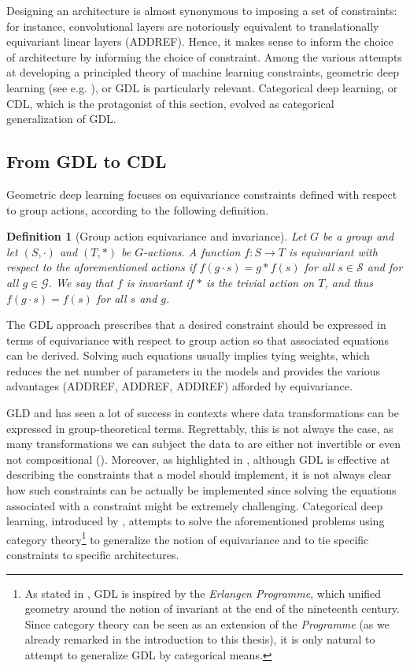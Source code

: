 \documentclass[12pt,a4paper,openright,twoside]{report}
\theoremstyle{plain}
\newtheorem{definition}[proposition]{Definition}
\theoremstyle{definition}
\begin{document}
Designing an architecture is almost synonymous to imposing a set of constraints: for instance, convolutional layers are notoriously equivalent to translationally equivariant linear layers (ADDREF).
Hence, it makes sense to inform the choice of architecture by informing the choice of constraint. Among the various attempts at developing a principled theory of machine learning constraints, geometric deep learning (see e.g. \cite{bronstein2021geometric}), or GDL is particularly relevant. Categorical deep learning, or CDL, which is the protagonist of this section, evolved as categorical generalization of GDL.


\subsection{From GDL to CDL}

Geometric deep learning focuses on equivariance constraints defined with respect to group actions, according to the following definition.

\begin{definition}[Group action equivariance and invariance]
  Let $G$ be a group and let $(S, \cdot)$ and $(T, \ast)$ be $G$-actions. A function $f: S \to T$ is equivariant with respect to the aforementioned actions if $f(g \cdot s) = g \ast f(s)$ for all $s \in \mathcal{S}$ and for all $g \in \mathcal{G}$. We say that $f$ is invariant if $\ast$ is the trivial action on $T$, and thus $f(g \cdot s) = f(s)$ for all $s$ and $g$.
\end{definition}

The GDL approach prescribes that a desired constraint should be expressed in terms of equivariance with respect to group action so that associated equations can be derived. Solving such equations usually implies tying weights, which reduces the net number of parameters in the models and provides the various advantages (ADDREF, ADDREF, ADDREF) afforded by equivariance.


GLD and has seen a lot of success in contexts where data transformations can be expressed in group-theoretical terms. Regrettably, this is not always the case, as many transformations we can subject the data to are either not invertible or even not compositional (\cite{gavranovicposition}). Moreover, as highlighted in \cite{gavranovicposition}, although GDL is effective at describing the constraints that a model should implement, it is not always clear how such constraints can be actually be implemented since solving the equations associated with a constraint might be extremely challenging.  
Categorical deep learning, introduced by \cite{gavranovicposition}, attempts to solve the aforementioned problems using category theory\footnote{As stated in \cite{bronstein2021geometric}, GDL is inspired by the \textit{Erlangen Programme}, which unified geometry around the notion of invariant at the end of the nineteenth century. Since category theory can be seen as an extension of the \textit{Programme} (as we already remarked in the introduction to this thesis), it is only natural to attempt to generalize GDL by categorical means.} to generalize the notion of equivariance and to tie specific constraints to specific architectures.
\end{document}
